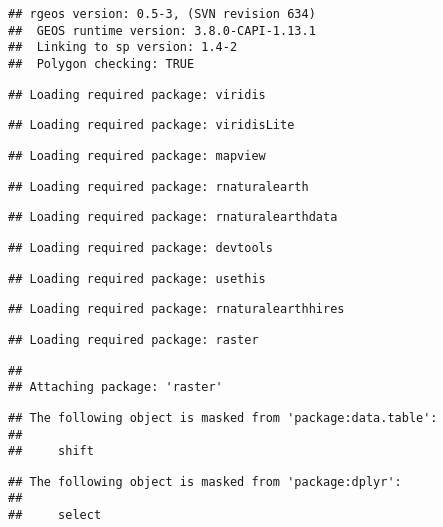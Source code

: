 \documentclass[
]{article}
\begin{document}
\begin{verbatim}
## rgeos version: 0.5-3, (SVN revision 634)
##  GEOS runtime version: 3.8.0-CAPI-1.13.1 
##  Linking to sp version: 1.4-2 
##  Polygon checking: TRUE
\end{verbatim}

\begin{verbatim}
## Loading required package: viridis
\end{verbatim}

\begin{verbatim}
## Loading required package: viridisLite
\end{verbatim}

\begin{verbatim}
## Loading required package: mapview
\end{verbatim}

\begin{verbatim}
## Loading required package: rnaturalearth
\end{verbatim}

\begin{verbatim}
## Loading required package: rnaturalearthdata
\end{verbatim}

\begin{verbatim}
## Loading required package: devtools
\end{verbatim}

\begin{verbatim}
## Loading required package: usethis
\end{verbatim}

\begin{verbatim}
## Loading required package: rnaturalearthhires
\end{verbatim}

\begin{verbatim}
## Loading required package: raster
\end{verbatim}

\begin{verbatim}
## 
## Attaching package: 'raster'
\end{verbatim}

\begin{verbatim}
## The following object is masked from 'package:data.table':
## 
##     shift
\end{verbatim}

\begin{verbatim}
## The following object is masked from 'package:dplyr':
## 
##     select
\end{verbatim}
\end{document}
